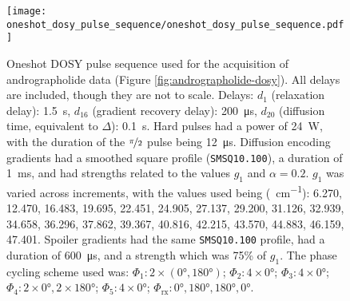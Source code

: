 \begin{figure}[H]
    \centering
    \texttt{[image: oneshot\_dosy\_pulse\_sequence/oneshot\_dosy\_pulse\_sequence.pdf]}
    \caption[
        Oneshot \acs{DOSY} pulse sequence used for the acquisition of
        andrographolide data.
    ]{
        Oneshot \ac{DOSY} pulse sequence used for the acquisition of
        andrographolide data (Figure \ref{fig:andrographolide-dosy}). All
        delays are included, though they are not to scale.
        Delays:
        $d_1$ (relaxation delay): \qty{1.5}{\second},
        $d_{16}$ (gradient recovery delay): \qty{200}{\micro\second},
        $d_{20}$ (diffusion time, equivalent to $\Delta$): \qty{0.1}{\second}.
        Hard pulses had a power of \qty{24}{\watt},
        with the duration of the $\nicefrac{\pi}{2}$ pulse being
        \qty{12}{\micro\second}.
        Diffusion encoding gradients had a smoothed square profile
        (\texttt{SMSQ10.100}), a duration of \qty{1}{\milli\second}, and had
        strengths related to the values $g_1$ and $\alpha = 0.2$.
        $g_1$ was varied across increments, with the values used
        being (\unit{\gauss \per \centi \meter}):
        6.270,
        12.470,
        16.483,
        19.695,
        22.451,
        24.905,
        27.137,
        29.200,
        31.126,
        32.939,
        34.658,
        36.296,
        37.862,
        39.367,
        40.816,
        42.215,
        43.570,
        44.883,
        46.159,
        47.401.
        Spoiler gradients had the same \texttt{SMSQ10.100} profile, had a
        duration of \qty{600}{\micro\second}, and a strength which was 75\% of
        $g_1$.
        The phase cycling scheme used was:
        $\Phi_1: 2 \times (\ang{0}, \ang{180})$;
        $\Phi_2: 4 \times \ang{0}$;
        $\Phi_3: 4 \times \ang{0}$;
        $\Phi_4: 2 \times \ang{0}, 2 \times \ang{180}$;
        $\Phi_5: 4 \times \ang{0}$;
        $\Phi_{\text{rx}}: \ang{0}, \ang{180}, \ang{180}, \ang{0}$.
    }
    \label{fig:oneshot-dosy}
\end{figure}

